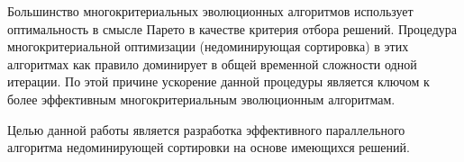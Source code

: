 \startprefacepage
Большинство многокритериальных эволюционных алгоритмов использует оптимальность в смысле Парето в качестве критерия отбора решений. Процедура многокритериальной оптимизации (недоминирующая сортировка) в этих алгоритмах как правило доминирует в общей временной сложности одной итерации. По этой причине ускорение данной процедуры является ключом к более эффективным многокритериальным эволюционным алгоритмам.

Целью данной работы является разработка эффективного параллельного алгоритма недоминирующей сортировки на основе имеющихся решений.

